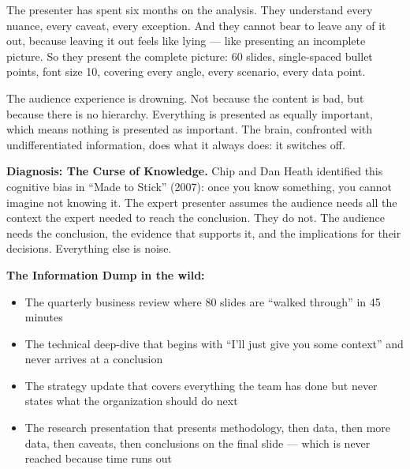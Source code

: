 The presenter has spent six months on the analysis. They understand every nuance, every caveat, every exception. And they cannot bear to leave any of it out, because leaving it out feels like lying --- like presenting an incomplete picture. So they present the complete picture: 60 slides, single-spaced bullet points, font size 10, covering every angle, every scenario, every data point.

The audience experience is drowning. Not because the content is bad, but because there is no hierarchy. Everything is presented as equally important, which means nothing is presented as important. The brain, confronted with undifferentiated information, does what it always does: it switches off.

\begin{diagnosisbox}
\textbf{Diagnosis: The Curse of Knowledge.} Chip and Dan Heath identified this cognitive bias in ``Made to Stick'' (2007): once you know something, you cannot imagine not knowing it. The expert presenter assumes the audience needs all the context the expert needed to reach the conclusion. They do not. The audience needs the conclusion, the evidence that supports it, and the implications for their decisions. Everything else is noise.
\end{diagnosisbox}

\textbf{The Information Dump in the wild:}

\begin{itemize}
  \item The quarterly business review where 80 slides are ``walked through'' in 45 minutes
  \item The technical deep-dive that begins with ``I'll just give you some context'' and never arrives at a conclusion
  \item The strategy update that covers everything the team has done but never states what the organization should do next
  \item The research presentation that presents methodology, then data, then more data, then caveats, then conclusions on the final slide --- which is never reached because time runs out
\end{itemize}

